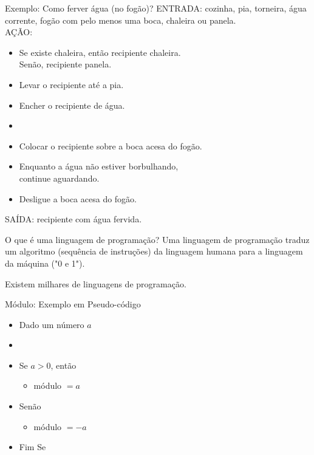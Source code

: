 \documentclass[hyperref={pdfpagelabels=false}]{beamer}
\begin{document}
\begin{frame}{Exemplo: Como ferver água (no fogão)?}
  ENTRADA: cozinha, pia, torneira, água corrente, fogão com pelo menos uma boca, chaleira ou panela.\\
  AÇÃO: 
  \begin{itemize}
  \item Se existe chaleira, então recipiente  chaleira. \\
		Senão, recipiente  panela.
  \item Levar o recipiente até a pia.
  \item Encher o recipiente de água.
  \item {}
  \item Colocar o recipiente sobre a boca acesa do fogão.
  \item Enquanto a água não estiver borbulhando, \\
		continue aguardando.
  \item Desligue a boca acesa do fogão.
  \end{itemize}
  SAÍDA: recipiente com água fervida.
\end{frame}

\begin{frame}{O que é uma linguagem de programação?}
	Uma linguagem de programação traduz um algoritmo (sequência de instruções) da linguagem humana para a linguagem da máquina ("0 e 1").
	
	Existem milhares de linguagens de programação.
\end{frame}

\begin{frame}{Módulo: Exemplo em Pseudo-código}
  \begin{center}
	  \begin{itemize}
		\item[] Dado um número $a$
		\item[]
		\item[] Se $a > 0$, então
		  \begin{itemize}
		  \item[] módulo $= a $
		  \end{itemize}
		\item[] Senão
		  \begin{itemize}
		  \item[] módulo $= -a$
		  \end{itemize}
		\item[] Fim Se
	  \end{itemize}
	\end{center}
\end{frame}
\end{document}
